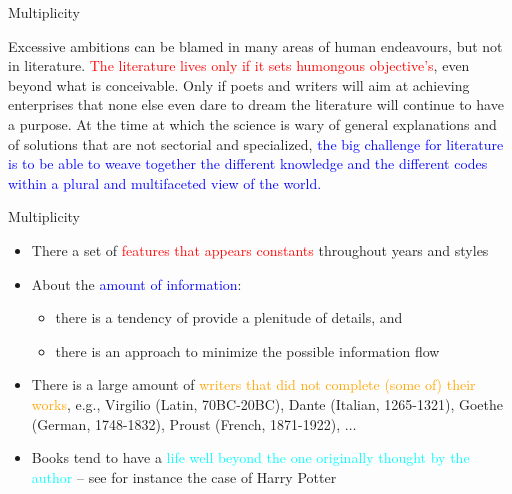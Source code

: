 \documentclass{beamer}
\begin{document}
\begin{frame}
{\centerline{Multiplicity}}
\begin{tcolorbox}[fonttitle=\bfseries,nobeforeafter,center title,colback=yellow!5,colframe=yellow!40!black,title=Ambition of Literature]
Excessive ambitions can be blamed in many areas of human endeavours, but not in literature. \textcolor{red}{The literature lives only if it sets humongous objective's}, even beyond what is conceivable. Only if poets and writers will aim at achieving enterprises that  none else even dare to dream the literature will continue to have a purpose. At the time at which the science is wary of general explanations and of solutions that are not sectorial and specialized, \textcolor{blue}{the big challenge for literature is to be able to weave together the different knowledge and the different codes within a plural and multifaceted view of the world.}
\end{tcolorbox}

\end{frame}

\begin{frame}
{\centerline{Multiplicity}}
\begin{itemize}
    \item There a set of \textcolor{red}{features that appears constants} throughout years and styles
    \item About the \textcolor{blue}{amount of information}:
    \begin{itemize}
        \item there is a tendency of provide a plenitude of details, and
        \item there is an approach to minimize the possible information flow 
    \end{itemize}
    \item There is a large amount of \textcolor{orange}{writers that did not complete (some of) their works}, e.g., Virgilio (Latin, 70BC-20BC), Dante (Italian, 1265-1321), Goethe (German, 1748-1832), Proust (French, 1871-1922), $\ldots{}$
    \item Books tend to have a \textcolor{cyan}{life well beyond the one originally thought by the author} -- see for instance the case of Harry Potter

\end{itemize}   
\end{frame}
\end{document}
